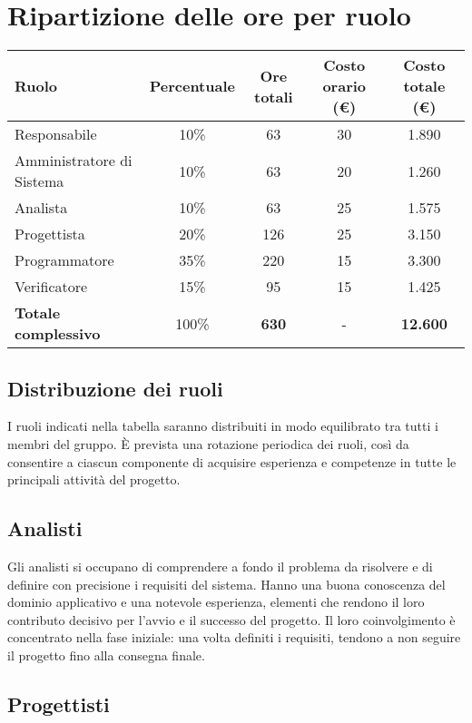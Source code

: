 \documentclass[a4paper, 11pt, oneside]{scrartcl} %
\begin{document}
\section{Ripartizione delle ore per ruolo}

\begin{center}
\begin{tabular}{|l|c|c|c|c|}
\hline
\textbf{Ruolo} & \textbf{Percentuale} & \textbf{Ore totali} & \textbf{Costo orario (€)} & \textbf{Costo totale (€)} \\
\hline
Responsabile & 10\% & 63 & 30 & 1.890 \\
Amministratore di Sistema & 10\% & 63 & 20 & 1.260 \\
Analista & 10\% & 63 & 25 & 1.575 \\
Progettista & 20\% & 126 & 25 & 3.150 \\
Programmatore & 35\% & 220 & 15 & 3.300 \\
Verificatore & 15\% & 95 & 15 & 1.425 \\
\hline
\textbf{Totale complessivo} & 100\% & \textbf{630} & - & \textbf{12.600} \\
\hline
\end{tabular}
\end{center}

\subsection{Distribuzione dei ruoli}

I ruoli indicati nella tabella saranno distribuiti in modo equilibrato tra tutti i membri del gruppo.  
È prevista una rotazione periodica dei ruoli, così da consentire a ciascun componente di acquisire esperienza e competenze in tutte le principali attività del progetto.

\subsection{Analisti}

Gli analisti si occupano di comprendere a fondo il problema da risolvere e di definire con precisione i requisiti del sistema.  
Hanno una buona conoscenza del dominio applicativo e una notevole esperienza, elementi che rendono il loro contributo decisivo per l’avvio e il successo del progetto.  
Il loro coinvolgimento è concentrato nella fase iniziale: una volta definiti i requisiti, tendono a non seguire il progetto fino alla consegna finale.

\subsection{Progettisti}
\end{document}
